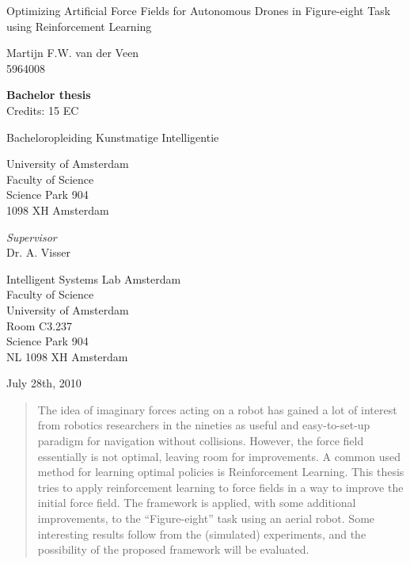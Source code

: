 \documentclass[11pt]{article}
\begin{document}
\begin{titlepage}
\begin{center}

\vspace{2.5cm}

\begin{huge}
Optimizing Artificial Force Fields for Autonomous Drones in Figure-eight Task using Reinforcement Learning
\end{huge}

\vspace{1.5cm}
Martijn F.W. van der Veen\\
5964008

\vspace{1cm}
\textbf{Bachelor thesis}\\
Credits: 15 EC

\vspace{0.25cm}
Bacheloropleiding Kunstmatige Intelligentie

\vspace{0.25cm}
University of Amsterdam\\
Faculty of Science\\
Science Park 904\\
1098 XH Amsterdam

\vspace{2cm}
\emph{Supervisor}\\
Dr. A. Visser

\vspace{0.25cm}
Intelligent Systems Lab Amsterdam\\
Faculty of Science\\
University of Amsterdam\\
Room C3.237\\
Science Park 904\\
NL 1098 XH Amsterdam

\vspace{1.5cm}
July 28th, 2010

\end{center}
\end{titlepage}

\pagebreak



\thispagestyle{empty} %
\begin{abstract}
The idea of imaginary forces acting on a robot has gained a lot of interest from robotics researchers in the nineties as useful and easy-to-set-up paradigm for navigation without collisions. However, the force field essentially is not optimal, leaving room for improvements. A common used method for learning optimal policies is Reinforcement Learning. This thesis tries to apply reinforcement learning to force fields in a way to improve the initial force field. The framework is applied, with some additional improvements, to the ``Figure-eight'' task using an aerial robot. Some interesting results follow from the (simulated) experiments, and the possibility of the proposed framework will be evaluated.
\end{abstract}
\end{document}
